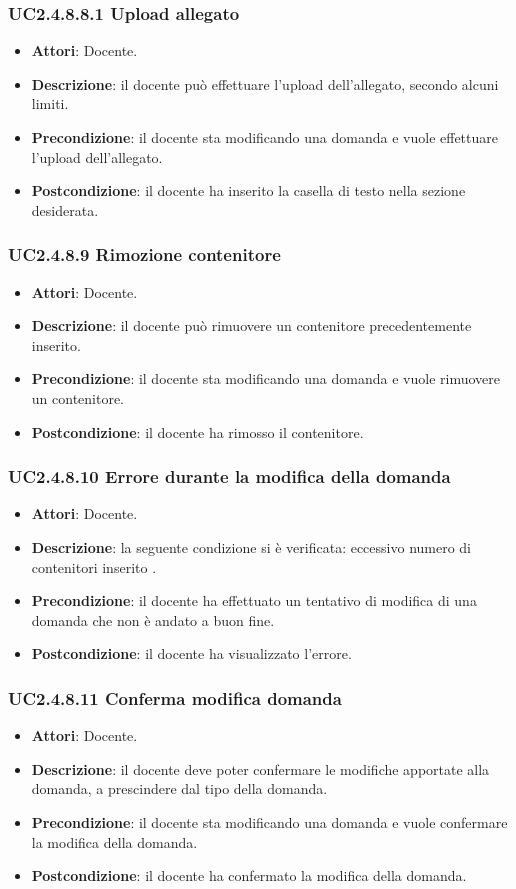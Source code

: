 \subsubsection{UC2.4.8.8.1 Upload allegato}
\begin{itemize}
\item \textbf{Attori}: Docente.
\item \textbf{Descrizione}: il docente può effettuare l'upload dell'allegato, secondo alcuni limiti.
\item \textbf{Precondizione}: il docente sta modificando una domanda e vuole effettuare l'upload dell'allegato.
\item \textbf{Postcondizione}: il docente ha inserito la casella di testo nella sezione desiderata.
\end{itemize}
\subsubsection{UC2.4.8.9 Rimozione contenitore}
\begin{itemize}
\item \textbf{Attori}: Docente.
\item \textbf{Descrizione}: il docente può rimuovere un contenitore precedentemente inserito.
\item \textbf{Precondizione}: il docente sta modificando una domanda e vuole rimuovere un contenitore.
\item \textbf{Postcondizione}: il docente ha rimosso il contenitore.
\end{itemize}
\subsubsection{UC2.4.8.10 Errore durante la modifica della domanda}
\begin{itemize}
\item \textbf{Attori}: Docente.
\item \textbf{Descrizione}: la seguente condizione si è verificata: eccessivo numero di contenitori inserito
.
\item \textbf{Precondizione}: il docente ha effettuato un tentativo di modifica di una domanda che non è andato a buon fine.
\item \textbf{Postcondizione}: il docente ha visualizzato l'errore.
\end{itemize}
\subsubsection{UC2.4.8.11 Conferma modifica domanda}
\begin{itemize}
\item \textbf{Attori}: Docente.
\item \textbf{Descrizione}: il docente deve poter confermare le modifiche apportate alla domanda, a prescindere dal tipo della domanda.
\item \textbf{Precondizione}: il docente sta modificando una domanda e vuole confermare la modifica della domanda.
\item \textbf{Postcondizione}: il docente ha confermato la modifica della domanda.
\end{itemize}
